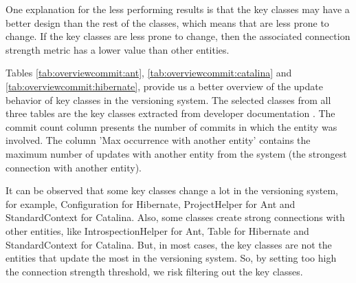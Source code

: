 \documentclass[runningheads]{comsis2}
\begin{document}
\begin{table}[!h]
\setlength\tabcolsep{3.5pt}
\caption{Measurements for Hibernate using only logical dependencies}
\label{tab:measurementshistory:hibernate}
\centering
{}
\end{table}




One explanation for the less performing results is that the key classes may have a better design than the rest of the classes, which means that are less prone to change. If the key classes are less prone to change, then the associated connection strength metric has a lower value than other entities.

Tables \ref{tab:overviewcommit:ant}, \ref{tab:overviewcommit:catalina} and \ref{tab:overviewcommit:hibernate}, provide us a better overview of the update behavior of key classes in the versioning system. The selected classes from all three tables are the key classes extracted from developer documentation \cite{Finding-key-classes}. The commit count column presents the number of commits in which the entity was involved. The column 'Max occurrence with another entity' contains the maximum number of updates with another entity from the system (the strongest connection with another entity).

It can be observed that some key classes change a lot in the versioning system, for example, Configuration for Hibernate, ProjectHelper for Ant and StandardContext for Catalina. Also, some classes create strong connections with other entities, like IntrospectionHelper for Ant, Table for Hibernate and StandardContext for Catalina. But, in most cases, the key classes are not the entities that update the most in the versioning system.
So, by setting too high the connection strength threshold, we risk filtering out the key classes.
\end{document}
